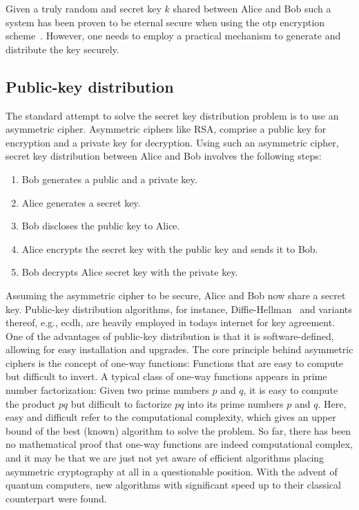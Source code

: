 Given a truly random and secret key $k$ shared between Alice and Bob such a system has been proven to be eternal secure when using the \gls{otp} encryption scheme~\cite{Shannon1949}.
However, one needs to employ a practical mechanism to generate and distribute the key securely.

\FloatBarrier
\subsection{Public-key distribution}

The standard attempt to solve the secret key distribution problem is to use an asymmetric cipher.
Asymmetric ciphers like RSA, comprise a public key for encryption and a private key for decryption.
Using such an asymmetric cipher, secret key distribution between Alice and Bob involves the following steps:
\begin{enumerate}
	\item Bob generates a public and a private key.
	\item Alice generates a secret key.
	\item Bob discloses the public key to Alice.
	\item Alice encrypts the secret key with the public key and sends it to Bob.
	\item Bob decrypts Alice secret key with the private key.
\end{enumerate}
Assuming the asymmetric cipher to be secure, Alice and Bob now share a secret key.
Public-key distribution algorithms, for instance, Diffie-Hellman~\cite{Diffie1976} and variants thereof, e.g., \gls{ecdh}, are heavily employed in todays internet for key agreement.
One of the advantages of public-key distribution is that it is software-defined, allowing for easy installation and upgrades.
The core principle behind asymmetric ciphers is the concept of one-way functions:
Functions that are easy to compute but difficult to invert.
A typical class of one-way functions appears in prime number factorization: Given two prime numbers $p$ and $q$, it is easy to compute the product $pq$ but difficult to factorize $pq$ into its prime numbers $p$ and $q$.
Here, easy and difficult refer to the computational complexity, which gives an upper bound of the best (known) algorithm to solve the problem.
So far, there has been no mathematical proof that one-way functions are indeed computational complex, and it may be that we are just not yet aware of efficient algorithms placing asymmetric cryptography at all in a questionable position.
With the advent of quantum computers, new algorithms with significant speed up to their classical counterpart were found.
